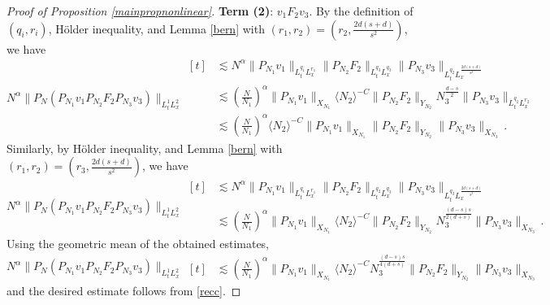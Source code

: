 \documentclass[aihp]{imsart}
\numberwithin{equation}{section}
\theoremstyle{plain}
\theoremstyle{remark}
\begin{document}
\begin{proof}[Proof of Proposition \ref{mainpropnonlinear}]
\textbf{Term (2)}: $v_1 F_2 v_3$. By the definition of $(q_i, r_i)$, H\" older inequality, 
and Lemma \ref{bern} with $(r_1, r_2) = (r_2, \frac{2d (s+d)}{s^2})$, we have
\begin{equation*}
N^\alpha \|P_N (P_{N_1} v_1  P_{N_2} F_2 P_{N_3} v_3) \|_{L_t^{1} L_x^{2}}
\begin{aligned}[t]
& \lesssim  N^\alpha \|P_{N_1} v_1\|_{L_t^{q_1}L_x^{r_1}} \|P_{N_2} F_2\|_{L_t^{q_3 } L_x^{q_3}} \|P_{N_3} v_3\|_{L_t^{q_2} L_x^{\frac{2d (s+d)}{s^2}}}\\
& \lesssim \left(\frac{N}{N_1}\right)^\alpha \|P_{N_1} v_1\|_{X_{N_1}} \langle N_2 \rangle^{-C} \|P_{N_2} F_2\|_{Y_{N_2}}  N_3^{\frac{d-s}{2} } \|P_{N_3} v_3\|_{L_t^{q_2} L_x^{r_2}}  \\
&\lesssim  \left(\frac{N}{N_1}\right)^\alpha \langle N_2 \rangle^{-C}  \|P_{N_1} v_1\|_{X_{N_1}} \|P_{N_2} F_2\|_{Y_{N_2}} \|P_{N_3} v_3\|_{X_{N_3}} \,.
\end{aligned}
\end{equation*}
Similarly, by H\" older inequality, 
and Lemma \ref{bern} with $(r_1, r_2) = (r_3, \frac{2d (s+d)}{s^2})$, we have
\begin{equation*}
N^\alpha \|P_N (P_{N_1} v_1  P_{N_2} F_2 P_{N_3} v_3) \|_{L_t^{1} L_x^{2}} 
\begin{aligned}[t]
& \lesssim  N^\alpha \|P_{N_1} v_1\|_{L_t^{q_1}L_x^{r_1}} \|P_{N_2} F_2\|_{L_t^{q_2 } L_x^{q_3}} \|P_{N_3} v_3\|_{L_t^{q_3} L_x^{\frac{2d (s+d)}{s^2}}}\\
&\lesssim  \left(\frac{N}{N_1}\right)^\alpha  \|P_{N_1} v_1\|_{X_{N_1}} \langle N_2 \rangle^{-C}  \|P_{N_2} F_2\|_{Y_{N_2}} N_3^{\frac{(d-s)s}{2(d+s)}} \|P_{N_3} v_3\|_{X_{N_3}} \,.
\end{aligned}
\end{equation*}
Using the geometric mean of the obtained estimates, 
\begin{equation*}
N^\alpha \|P_N (P_{N_1} v_1  P_{N_2} F_2 P_{N_3} v_3) \|_{L_t^{1} L_x^{2}} 
\begin{aligned}[t]
&\lesssim  \left(\frac{N}{N_1}\right)^\alpha  \|P_{N_1} v_1\|_{X_{N_1}} \langle N_2 \rangle^{-C} N_3^{\frac{(d-s)s}{4(d+s)}} \|P_{N_2} F_2\|_{Y_{N_2}}  \|P_{N_3} v_3\|_{X_{N_3}} 
\end{aligned}
\end{equation*}
and the desired estimate follows from \eqref{recc}.


\end{proof}
\end{document}
